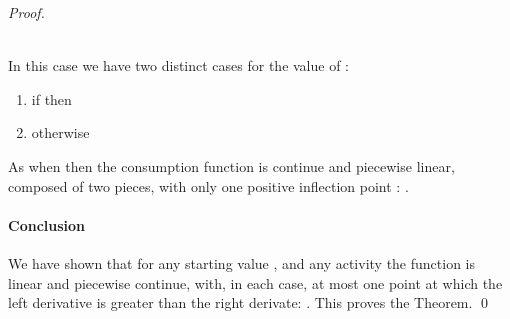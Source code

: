 \documentclass{llncs}
\begin{document}
{\begin{proof}
\begin{minipage}{0.45\textwidth}
\label{Fig:case4}
\end{minipage}\\
\noindent In this case we have two distinct  cases for the value of  :
\begin{enumerate}
\item if   then 
\item otherwise 
\end{enumerate}
As  when  then the consumption function is continue and piecewise linear,
composed of two pieces, with only one positive inflection point : . \paragraph{Conclusion}
We have shown that for any starting value , and any activity   the function  is linear and piecewise continue,
with, in each case, at most one point at which the left  derivative is greater than the right derivate: . This proves the Theorem.  \qed
\end{proof}
}




 \iffalse
\end{document}
